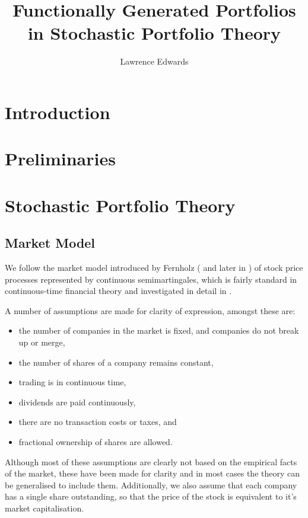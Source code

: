 \documentclass[british]{amsart}
\numberwithin{equation}{section}
\numberwithin{figure}{section}
\theoremstyle{plain}
\theoremstyle{definition}
\theoremstyle{plain}
\theoremstyle{plain}
\theoremstyle{plain}
\theoremstyle{remark}
\theoremstyle{plain}
\begin{document}
\title{Functionally Generated Portfolios in Stochastic Portfolio Theory}
\author{Lawrence Edwards}
\maketitle

\newpage

\tableofcontents{}

\newpage

\section{Introduction}

\newpage

\section{Preliminaries}

\newpage

\section{Stochastic Portfolio Theory}
\subsection{Market Model}

We follow the market model introduced by Fernholz (\cite{fernholz1999pgf} and later in \cite{fernholz2009}) of stock price processes represented by continuous semimartingales, which is fairly standard in continuous-time financial theory and investigated in detail in \cite{karatzas1998}.

A number of assumptions are made for clarity of expression, amongst these are:
\begin{itemize}
  \item the number of companies in the market is fixed, and companies do not break up or merge,
  \item the number of shares of a company remains constant,
  \item trading is in continuous time,
  \item dividends are paid continuously,
  \item there are no transaction costs or taxes, and
  \item fractional ownership of shares are allowed.
\end{itemize}

Although most of these assumptions are clearly not based on the empirical facts of the market, these have been made for clarity and in most cases the theory can be generalised to include them. Additionally, we also assume that each company has a single share outstanding, so that the price of the stock is equivalent to it's market capitalisation.
\end{document}
